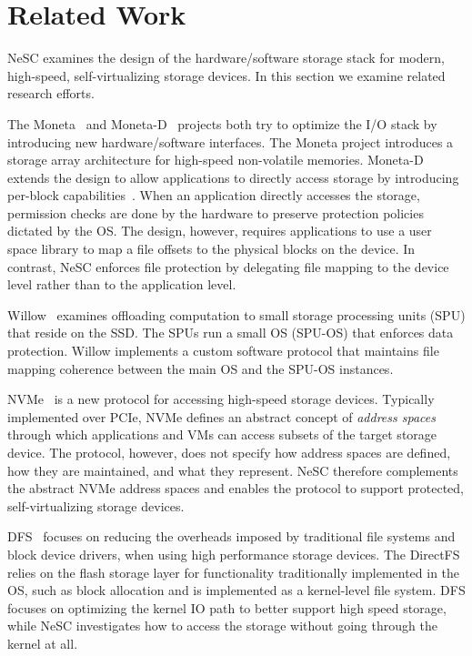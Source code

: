 \chapter{Related Work}
\label{chap:related}

NeSC examines the design of the hardware/software storage stack for modern, high-speed, self-virtualizing storage devices. In this section we examine related research efforts.

The Moneta~\cite{caulfield10moneta} and Moneta-D~\cite{caulfield12moneta-d} projects both try to optimize the I/O stack by introducing new hardware/software interfaces.
The Moneta project introduces a storage array architecture for high-speed non-volatile memories. Moneta-D extends the design to allow applications
to directly access storage by introducing per-block capabilities~\cite{levy1984capability}. When an application directly accesses the storage, permission checks are done by the hardware to preserve protection policies dictated by the OS.
The design, however, requires applications to use a user space library to map a file offsets to the physical blocks on the device.
In contrast, NeSC enforces file protection by delegating file mapping to the device level rather than to the application level.

Willow~\cite{seshadri2014willow} examines offloading computation to small storage processing units (SPU) that reside on the SSD. The SPUs run a small OS (SPU-OS) that enforces data protection. Willow implements a custom software protocol that maintains file mapping coherence between the main OS and the SPU-OS instances.

NVMe~\cite{nvme} is a new protocol for accessing high-speed storage devices. Typically implemented over PCIe, NVMe defines an abstract concept of \emph{address spaces} through which applications and VMs can access subsets of the target storage device. The protocol, however, does not specify how address spaces are defined, how they are maintained, and what they represent. 
NeSC therefore complements the abstract NVMe address spaces and enables the protocol to support protected, self-virtualizing storage devices.

DFS~\cite{josephson2010dfs} focuses on reducing the overheads imposed by traditional 
file systems and block device drivers, when using high performance storage devices.
The DirectFS relies on the flash storage layer for functionality traditionally implemented in the OS, such as block allocation and is implemented as a kernel-level file system. DFS focuses on optimizing the kernel IO path to better support high speed storage, while NeSC investigates how to access the storage without going through the kernel at all. 

